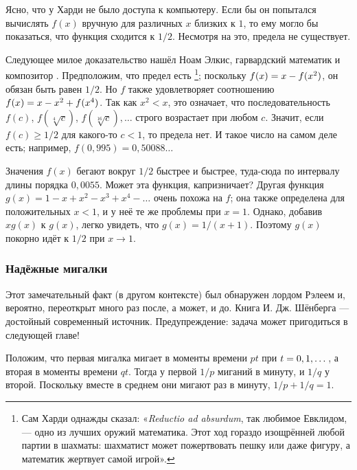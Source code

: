 Ясно, что у Харди не было доступа к компьютеру.
Если бы он попытался вычислять $f(x)$ вручную для различных $x$ близких к $1$, то ему могло бы показаться, что функция сходится к $1/2$.
Несмотря на это, предела не существует.

Следующее милое доказательство нашёл Ноам Элкис, гарвардский математик и композитор \cite[Problem 8]{elkies}.
Предположим, что предел есть%
\footnote{Сам Харди однажды сказал: «\emph{Reductio ad absurdum}, так любимое Евклидом, --- одно из лучших оружий математика.
Этот ход гораздо изощрённей любой партии в шахматы:
шахматист может пожертвовать пешку или даже фигуру, а математик жертвует самой игрой».};
поскольку $f(x)\z=x\z-f(x^2)$, он обязан быть равен $1/2$.
Но $f$ также удовлетворяет соотношению $f(x)\z=x\z-x^2\z+f(x^4)$.
Так как $x^2 < x$, это означает, что последовательность $f(c)$, $f(\sqrt[4]{c})$, $f(\sqrt[16]{c}),\dots$ строго возрастает при любом $c$.
Значит, если $f(c)\ge1/2$ для какого-то $c<1$, то предела нет.
И такое число на самом деле есть; например, $f(0{,}995)=0{,}50088\dots$

Значения $f(x)$ бегают вокруг $1/2$ быстрее и быстрее, туда-сюда по интервалу длины порядка $0{,}0055$.
Может эта функция, капризничает?
Другая функция $g(x)=1-x+x^2-x^3+x^4-\dots$ очень похожа на $f$;
она также определена для положительных $x < 1$, и у неё те же проблемы при $x = 1$.
Однако, добавив $xg(x)$ к $g(x)$, легко увидеть, что $g(x)=1/(x+1)$.
Поэтому $g(x)$ покорно идёт к $1/2$ при $x \to 1$.


\subsubsection*{Надёжные мигалки}

Этот замечательный факт (в другом контексте) был обнаружен лордом Рэлеем \cite[раздел 92а]{rayleigh} и, вероятно, переоткрыт много раз после, а может, и до.
Книга И. Дж. Шёнберга \cite{52} --- достойный современный источник. Предупреждение: задача может пригодиться в следующей главе!

Положим, что первая мигалка мигает в моменты времени $pt$ при $t \z= 0, 1, \dots$, а вторая в моменты времени $qt$.
Тогда у первой $1/p$ миганий в минуту, и $1/q$ у второй.
Поскольку вместе в среднем они мигают раз в минуту,  $1/p + 1/q = 1$.

